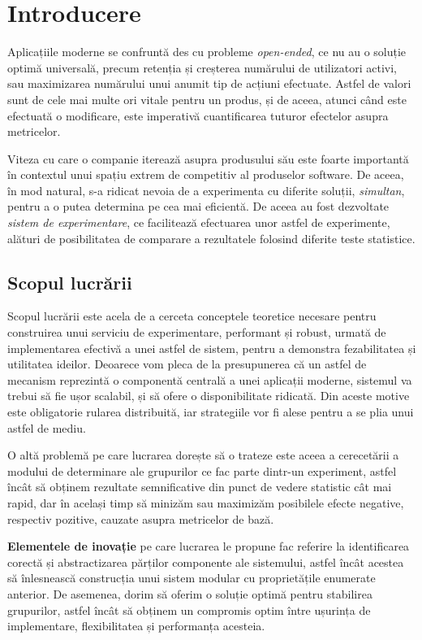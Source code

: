 \chapter{Introducere}

Aplicațiile moderne se confruntă des cu probleme \textit{open-ended}, ce nu au o soluție optimă universală, precum retenția și creșterea numărului de utilizatori activi, sau maximizarea numărului unui anumit tip de acțiuni efectuate. Astfel de valori sunt de cele mai multe ori vitale pentru un produs, și de aceea, atunci când este efectuată o modificare, este imperativă cuantificarea tuturor efectelor asupra metricelor.

Viteza cu care o companie iterează asupra produsului său este foarte importantă în contextul unui spațiu extrem de competitiv al produselor software. De aceea, în mod natural, s-a ridicat nevoia de a experimenta cu diferite soluții, \textit{simultan}, pentru a o putea determina pe cea mai eficientă. De aceea au fost dezvoltate \textit{sistem de experimentare}, ce facilitează efectuarea unor astfel de experimente, alături de posibilitatea de comparare a rezultatele folosind diferite teste statistice.

\section{Scopul lucrării}

Scopul lucrării este acela de a cerceta conceptele teoretice necesare pentru construirea unui serviciu de experimentare, performant și robust, urmată de implementarea efectivă a unei astfel de sistem, pentru a demonstra fezabilitatea și utilitatea ideilor. Deoarece vom pleca de la presupunerea că un astfel de mecanism reprezintă o componentă centrală a unei aplicații moderne, sistemul va trebui să fie ușor scalabil, și să ofere o disponibilitate ridicată. Din aceste motive este obligatorie rularea distribuită, iar strategiile vor fi alese pentru a se plia unui astfel de mediu.

O altă problemă pe care lucrarea dorește să o trateze este aceea a cerecetării a modului de determinare ale grupurilor ce fac parte dintr-un experiment, astfel încât să obținem rezultate semnificative din punct de vedere statistic cât mai rapid, dar în același timp să minizăm sau maximizăm posibilele efecte negative, respectiv pozitive, cauzate asupra metricelor de bază. 

\textbf{Elementele de inovație} pe care lucrarea le propune fac referire la identificarea corectă și abstractizarea părților componente ale sistemului, astfel încât acestea să înlesnească construcția unui sistem modular cu proprietățile enumerate anterior. De asemenea, dorim să oferim o soluție optimă pentru stabilirea grupurilor, astfel încât să obținem un compromis optim între ușurința de implementare, flexibilitatea și performanța acesteia.

